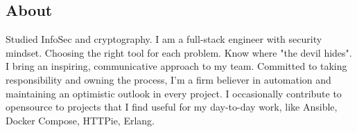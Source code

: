 \documentclass[letterpaper, 11pt]{article}
\begin{document}

\subsection*{About}

Studied InfoSec and cryptography. I am a full-stack engineer with security mindset.
Choosing the right tool for each problem. Know where "the devil hides". I bring an inspiring, communicative approach to my team.
Committed to taking responsibility and owning the process, I'm a firm believer in automation and maintaining an optimistic outlook in every project.
I occasionally contribute to opensource to projects that I find useful for my day-to-day work, like Ansible, Docker Compose, HTTPie, Erlang.









% 

% 




\end{document}
